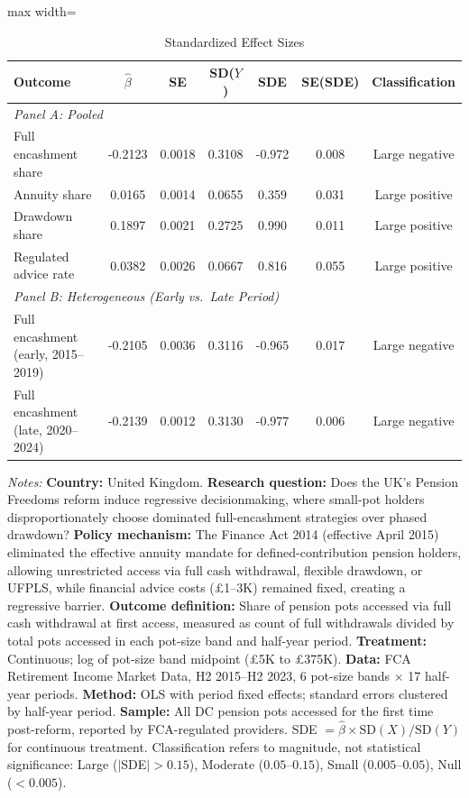 \begin{table}[htbp]
\centering
\caption{Standardized Effect Sizes}
\label{tab:sde}
\begin{adjustbox}{max width=\textwidth}
\begin{threeparttable}
\begin{tabular}{lcccccc}
\toprule
Outcome & $\hat{\beta}$ & SE & SD($Y$) & SDE & SE(SDE) & Classification \\
\midrule
\multicolumn{7}{l}{\textit{Panel A: Pooled}} \\
Full encashment share & -0.2123 & 0.0018 & 0.3108 & -0.972 & 0.008 & Large negative \\
Annuity share & 0.0165 & 0.0014 & 0.0655 & 0.359 & 0.031 & Large positive \\
Drawdown share & 0.1897 & 0.0021 & 0.2725 & 0.990 & 0.011 & Large positive \\
Regulated advice rate & 0.0382 & 0.0026 & 0.0667 & 0.816 & 0.055 & Large positive \\
\midrule
\multicolumn{7}{l}{\textit{Panel B: Heterogeneous (Early vs.\ Late Period)}} \\
Full encashment (early, 2015--2019) & -0.2105 & 0.0036 & 0.3116 & -0.965 & 0.017 & Large negative \\
Full encashment (late, 2020--2024) & -0.2139 & 0.0012 & 0.3130 & -0.977 & 0.006 & Large negative \\
\bottomrule
\end{tabular}
\begin{tablenotes}[flushleft]\footnotesize
\item[] \textit{Notes:} \textbf{Country:} United Kingdom. \textbf{Research question:} Does the UK's Pension Freedoms reform induce regressive decisionmaking, where small-pot holders disproportionately choose dominated full-encashment strategies over phased drawdown? \textbf{Policy mechanism:} The Finance Act 2014 (effective April 2015) eliminated the effective annuity mandate for defined-contribution pension holders, allowing unrestricted access via full cash withdrawal, flexible drawdown, or UFPLS, while financial advice costs (\pounds1--3K) remained fixed, creating a regressive barrier. \textbf{Outcome definition:} Share of pension pots accessed via full cash withdrawal at first access, measured as count of full withdrawals divided by total pots accessed in each pot-size band and half-year period. \textbf{Treatment:} Continuous; log of pot-size band midpoint (\pounds5K to \pounds375K). \textbf{Data:} FCA Retirement Income Market Data, H2 2015--H2 2023, 6 pot-size bands $\times$ 17 half-year periods. \textbf{Method:} OLS with period fixed effects; standard errors clustered by half-year period. \textbf{Sample:} All DC pension pots accessed for the first time post-reform, reported by FCA-regulated providers. SDE $= \hat{\beta} \times \text{SD}(X) / \text{SD}(Y)$ for continuous treatment. Classification refers to magnitude, not statistical significance: Large ($|$SDE$| > 0.15$), Moderate ($0.05$--$0.15$), Small ($0.005$--$0.05$), Null ($< 0.005$).
\end{tablenotes}
\end{threeparttable}
\end{adjustbox}
\end{table}


